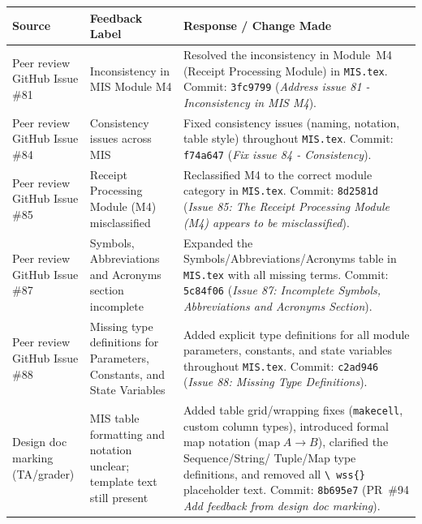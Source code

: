 \documentclass{article}
\begin{document}
\begin{longtable}{p{3.2cm} p{3.8cm} p{7.4cm}}
\toprule
\textbf{Source} & \textbf{Feedback Label} & \textbf{Response / Change Made} \\
\midrule
\endhead

Peer review GitHub Issue \#81
  & Inconsistency in MIS Module M4
  & Resolved the inconsistency in Module~M4 (Receipt Processing Module)
    in \texttt{MIS.tex}.
    Commit: \texttt{3fc9799}
    (\textit{Address issue 81 - Inconsistency in MIS M4}).
\\[4pt]

Peer review GitHub Issue \#84
  & Consistency issues across MIS
  & Fixed consistency issues (naming, notation, table style) throughout
    \texttt{MIS.tex}.
    Commit: \texttt{f74a647}
    (\textit{Fix issue 84 - Consistency}).
\\[4pt]

Peer review GitHub Issue \#85
  & Receipt Processing Module (M4) misclassified
  & Reclassified M4 to the correct module category in
    \texttt{MIS.tex}.
    Commit: \texttt{8d2581d}
    (\textit{Issue 85: The Receipt Processing Module (M4) appears to be
    misclassified}).
\\[4pt]

Peer review GitHub Issue \#87
  & Symbols, Abbreviations and Acronyms section incomplete
  & Expanded the Symbols/Abbreviations/Acronyms table in
    \texttt{MIS.tex} with all missing terms.
    Commit: \texttt{5c84f06}
    (\textit{Issue 87: Incomplete Symbols, Abbreviations and Acronyms
    Section}).
\\[4pt]

Peer review GitHub Issue \#88
  & Missing type definitions for Parameters, Constants, and State
    Variables
  & Added explicit type definitions for all module parameters, constants,
    and state variables throughout \texttt{MIS.tex}.
    Commit: \texttt{c2ad946}
    (\textit{Issue 88: Missing Type Definitions}).
\\[4pt]

Design doc marking (TA/grader)
  & MIS table formatting and notation unclear; template text still
    present
  & Added table grid/wrapping fixes (\texttt{makecell}, custom column
    types), introduced formal map notation
    ($\text{map}\; A \rightarrow B$), clarified the Sequence/String/
    Tuple/Map type definitions, and removed all \texttt{\textbackslash
    wss\{\}} placeholder text.
    Commit: \texttt{8b695e7} (PR~\#94
    \textit{Add feedback from design doc marking}).
\\[4pt]


\end{longtable}
\end{document}
